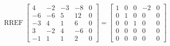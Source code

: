 \begin{exerciseAnswer} 


\[\operatorname{RREF} \left[\begin{array}{cccc|c}
4 & -2 & -3 & -8 & 0 \\
-6 & -6 & 5 & 12 & 0 \\
-3 & 4 & 1 & 6 & 0 \\
3 & -2 & 4 & -6 & 0 \\
-1 & 1 & 1 & 2 & 0
\end{array}\right] = \left[\begin{array}{cccc|c}
1 & 0 & 0 & -2 & 0 \\
0 & 1 & 0 & 0 & 0 \\
0 & 0 & 1 & 0 & 0 \\
0 & 0 & 0 & 0 & 0 \\
0 & 0 & 0 & 0 & 0
\end{array}\right] \]



\end{exerciseAnswer}
